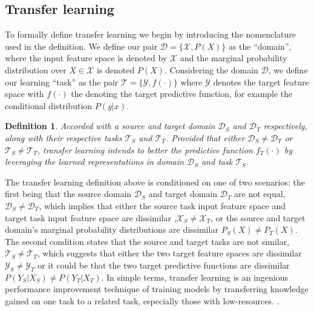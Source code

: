 \documentclass[11pt,a4paper]{article}
\newtheorem{definition}{Definition}
\begin{document}
\subsection{Transfer learning}\label{sec:  transfer learning}
To formally define transfer learning we begin by introducing the nomenclature used in the definition. We define our pair  $\mathcal{D} = \{\mathcal{X}, P(X)\}$ as the ``domain'', where the input feature space is denoted by $\mathcal{X}$ and the marginal probability distribution over $X \in \mathcal{X}$ is denoted $P(X)$. Considering the domain $\mathcal{D}$, we define our learning ``task'' as the pair $\mathcal{T}= \{\mathcal{Y}, f(\cdot)\}$ where $\mathcal{Y}$ denotes the target feature space with $f(\cdot)$ the denoting the target predictive function, for example the conditional distribution $P(y|x)$. 

\begin{definition}
Accorded with a source and target domain $\mathcal{D}_{S}$ and $\mathcal{D}_{T}$ respectively, along with their respective tasks $\mathcal{T}_{S}$ and $\mathcal{T}_{T}$. Provided that either $\mathcal{D}_{S} \neq \mathcal{D}_{T}$ or  $\mathcal{T}_{S} \neq \mathcal{T}_{T}$, transfer learning intends to better the predictive function $f_{T}(\cdot)$ by leveraging the learned representations in domain $\mathcal{D}_{S}$ and task $\mathcal{T}_{S}$.
\end{definition}


The transfer learning definition above is conditioned on one of two scenarios: the first being that the source domain $\mathcal{D}_{S}$ and target domain $\mathcal{D}_{T}$ are not equal, $\mathcal{D}_{S} \neq \mathcal{D}_{T}$, which implies that either the source task input feature space and target task input feature space are dissimilar ,$\mathcal{X}_{S} \neq \mathcal{X}_{T}$, or the source and target domain's marginal probability distributions are dissimilar $P_{S}(X) \neq P_{T}(X)$. The second condition states that the source and target tasks are not similar, $\mathcal{T}_{S} \neq \mathcal{T}_{T}$, which suggests that either the two target feature spaces are dissimilar $\mathcal{Y}_{S} \neq \mathcal{Y}_{T}$ or it could be that the two target predictive functions are dissimilar $P(Y_{S}|X_{S}) \neq P(Y_{T}|X_{T})$. In simple terms, transfer learning is an ingenious performance improvement technique of training models by transferring knowledge gained on one task to a related task, especially those with low-resources. \cite{torrey2010transfer}.  
\end{document}
